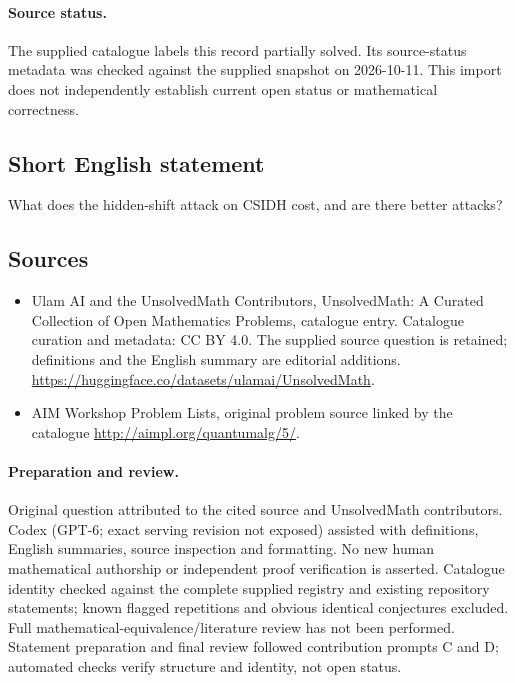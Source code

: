 \documentclass[11pt]{article}
\begin{document}
\paragraph{Source status.}
The supplied catalogue labels this record partially solved. Its source-status metadata was checked against the supplied snapshot on 2026-10-11. This import does not independently establish current open status or mathematical correctness.
\subsection{Short English statement}
What does the hidden-shift attack on CSIDH cost, and are there better attacks?
\subsection{Sources}
\begin{itemize}
\item[S1] Ulam AI and the UnsolvedMath Contributors, UnsolvedMath: A Curated Collection of Open Mathematics Problems, catalogue entry. Catalogue curation and metadata: CC BY 4.0. The supplied source question is retained; definitions and the English summary are editorial additions.
\url{https://huggingface.co/datasets/ulamai/UnsolvedMath}.
\item[S2] AIM Workshop Problem Lists, original problem source linked by the catalogue
\url{http://aimpl.org/quantumalg/5/}.
\end{itemize}
\paragraph{Preparation and review.}
Original question attributed to the cited source and UnsolvedMath contributors. Codex (GPT-6; exact serving revision not exposed) assisted with definitions, English summaries, source inspection and formatting. No new human mathematical authorship or independent proof verification is asserted. Catalogue identity checked against the complete supplied registry and existing repository statements; known flagged repetitions and obvious identical conjectures excluded. Full mathematical-equivalence/literature review has not been performed. Statement preparation and final review followed contribution prompts C and D; automated checks verify structure and identity, not open status.
\label{end:statement}
\end{document}
